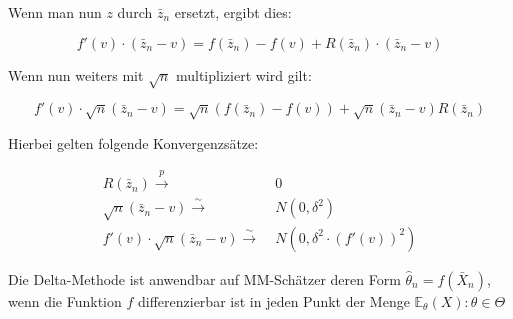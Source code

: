 \documentclass[10pt]{article}
\newcommand{\EW}{\mathbb{E}} %
\newcommand{\KW}{\overset{p} \longrightarrow} %
\newcommand{\KV}{\overset{\sim} \longrightarrow} %
\newenvironment{BWS}[1][]
{\begin{Beweis}[frametitle=#1]}{\end{Beweis}}
\begin{document}
\begin{BWS}[Beweis 1.1 Delta-Methode]
		Wenn man nun $z$ durch $\bar{z}_n$ ersetzt, ergibt dies:
		
		
		\begin{equation*}
			f'(v) \cdot (\bar{z}_n-v) = f(\bar{z}_n) - f(v) + R(\bar{z}_n) \cdot (\bar{z}_n-v)			
		\end{equation*}
		
		Wenn nun weiters mit $\sqrt{n}$ multipliziert wird gilt:
		
		\begin{equation*}
			f'(v) \cdot\sqrt{n} (\bar{z}_n-v) = \sqrt{n}(f(\bar{z}_n) - f(v)) + \sqrt{n} (\bar{z}_n-v)	R(\bar{z}_n)
		\end{equation*}
		
		Hierbei gelten folgende Konvergenzsätze:
		
		\begin{equation*}
			\begin{split}
			R(\bar{z}_n) \KW& \;0\\
			\sqrt{n} (\bar{z}_n-v) \KV& \;N(0,\delta^2)\\
			f'(v) \cdot\sqrt{n} (\bar{z}_n-v) \KV& \;N(0,\delta^2 \cdot (f'(v))^2)
			\end{split}
		\end{equation*}
		
		
	\end{BWS}
	
	\noindent Die Delta-Methode ist anwendbar auf MM-Schätzer deren Form $\hat{\theta}_n = f(\bar{X}_n)$, wenn die Funktion $f$ differenzierbar ist in jeden Punkt der Menge ${\EW_\theta(X) : \theta \in \Theta}$
	
	
	
\end{document}
